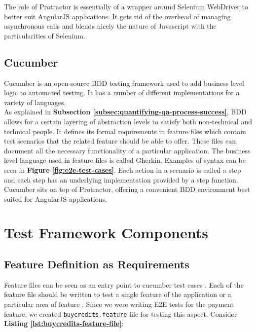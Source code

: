 The role of Protractor is essentially of a wrapper around Selenium WebDriver to better suit AngularJS applications. It gets rid of the overhead of managing asynchronous calls and blends nicely the nature of Javascript with the particularities of Selenium.

\subsection{Cucumber}
\label{subsec:cucumber}
Cucumber is an open-source BDD testing framework used to add business level logic to automated testing. It has a number of different implementations for a variety of languages.
\\

As explained in \textbf{Subsection \ref{subsec:quantifying-qa-process-success}}, BDD allows for a certain layering of abstraction levels to satisfy both non-technical and technical people. It defines its formal requirements in feature files which contain test scenarios that the related feature should be able to offer. These files can document all the necessary functionality of a particular application. The business level language used in feature files is called Gherkin. Examples of syntax can be seen in \textbf{Figure \ref{fig:e2e-test-cases}}. Each action in a scenario is called a step and each step has an underlying implementation provided by a step function.
\\

Cucumber sits on top of Protractor, offering a convenient BDD environment best suited for AngularJS applications.


\section{Test Framework Components}
\label{sec:test-framework-components}

\subsection{Feature Definition as Requirements}
\label{subsec:feautre-definition-as-requirements}

Feature files can be seen as an entry point to cucumber test cases \cite{featurefile1}. Each of the feature file should be written to test a single feature of the application or a particular area of feature \cite{featurefile2}. Since we were writing E2E tests for the payment feature, we created \texttt{buycredits.feature} file for testing this aspect. Consider \textbf{Listing \ref{lst:buycredits-feature-file}}:\\

